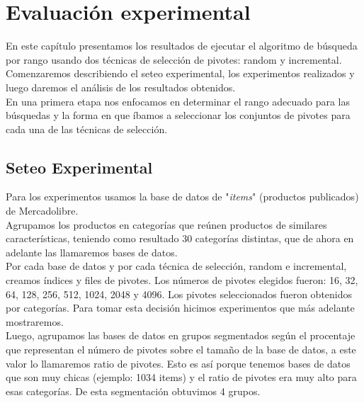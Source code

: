 \chapter{Evaluaci\'on experimental}

En este cap\'itulo presentamos los resultados de ejecutar el algoritmo de b\'usqueda por rango usando dos t\'ecnicas de selecci\'on de pivotes: random y incremental.\\

Comenzaremos describiendo el seteo experimental, los experimentos realizados y luego daremos el an\'alisis de los resultados obtenidos.\\

En una primera etapa nos enfocamos en determinar el rango adecuado para las b\'usquedas y la forma en que \'ibamos a seleccionar los conjuntos de pivotes para cada una de las t\'ecnicas de selecci\'on.\\

\section{Seteo Experimental}

Para los experimentos usamos la base de datos de "\textit{items}" (productos publicados) de Mercadolibre.\\
	
Agrupamos los productos en categor\'ias que re\'unen productos de similares caracter\'isticas, teniendo como resultado 30 categor\'ias distintas, que de  ahora en adelante las llamaremos bases de datos.\\

Por cada base de datos y por cada t\'ecnica de selecci\'on, random e incremental, creamos \'indices y files de pivotes. Los n\'umeros de pivotes elegidos fueron: 16, 32, 64, 128, 256, 512, 1024, 2048 y 4096. Los pivotes seleccionados fueron obtenidos por categor\'ias. Para tomar esta decisi\'on hicimos experimentos que m\'as adelante mostraremos.\\

Luego, agrupamos las bases de datos en grupos segmentados seg\'un el procentaje que representan el n\'umero de pivotes sobre el tama\~no de la base de datos, a este valor lo llamaremos ratio de pivotes. Esto es as\'i porque tenemos bases de datos que son muy chicas (ejemplo: 1034 items) y el ratio de pivotes era muy alto para esas categor\'ias. De esta segmentaci\'on obtuvimos 4 grupos.\\

